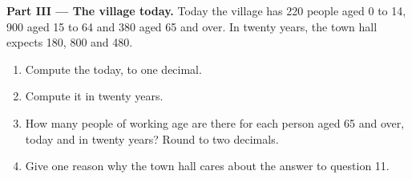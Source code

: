 \begin{problem}
\medskip
\noindent\textbf{Part III --- The village today.} Today the village has 220
people aged 0 to 14, 900 aged 15 to 64 and 380 aged 65 and over. In twenty
years, the town hall expects 180, 800 and 480.
\begin{enumerate}[resume]
  \item Compute the  today, to one decimal.
  \item Compute it in twenty years.
  \item How many people of working age are there for each person aged 65 and
        over, today and in twenty years? Round to two decimals.
  \item Give one reason why the town hall cares about the answer to
        question 11.
\end{enumerate}
\end{problem}
